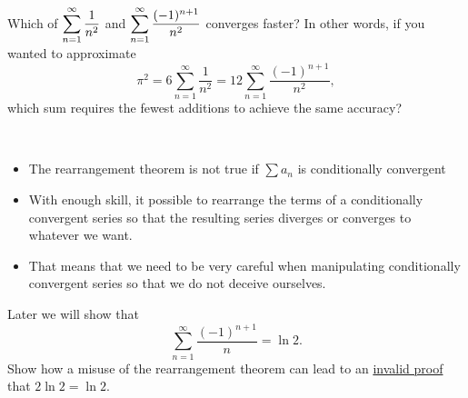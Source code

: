 \newpage

\begin{example}
Which of $\displaystyle\sum_{n=1}^\infty\frac{1}{n^2}$ and  $\displaystyle\sum_{n=1}^\infty\frac{(-1)^{n+1}}{n^2}$ converges faster?
In other words, if you wanted to approximate 
\begin{equation*}
\pi^2 = 6 \sum_{n=1}^\infty\frac{1}{n^2} = 12\sum_{n=1}^\infty\frac{(-1)^{n+1}}{n^2},
\end{equation*}
which sum requires the fewest additions to achieve the same accuracy?
\end{example}


\newpage

\begin{remark}\,
\begin{itemize}
\item The rearrangement theorem is not true if $\sum a_n$ is conditionally convergent
\item With enough skill, it possible to rearrange the terms of a conditionally convergent series so that the resulting series diverges or converges to whatever we want.
\item That means that we need to be very careful when manipulating conditionally convergent series so that we do not deceive ourselves.
\end{itemize}
\end{remark}

\begin{example}
Later we will show that
\begin{equation*}
\sum_{n=1}^\infty\frac{(-1)^{n+1}}{n} = \ln 2.
\end{equation*}
Show how a misuse of the rearrangement theorem can lead to an \underline{invalid proof} that $2\ln 2 = \ln 2$.
\end{example}
